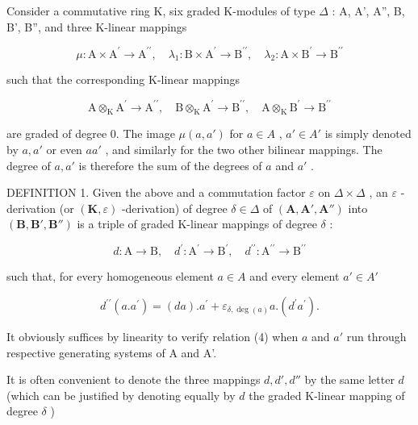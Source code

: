 Consider a commutative ring K, six graded K-modules of type \(\Delta\) : A, A', A'', B, B', B'', and three K-linear mappings

\[
\mu \colon \mathrm{A} \times \mathrm{A} ^ {\prime} \rightarrow \mathrm{A} ^ {\prime \prime}, \quad \lambda_ {1} \colon \mathrm{B} \times \mathrm{A} ^ {\prime} \rightarrow \mathrm{B} ^ {\prime \prime}, \quad \lambda_ {2} \colon \mathrm{A} \times \mathrm{B} ^ {\prime} \rightarrow \mathrm{B} ^ {\prime \prime}
\]

such that the corresponding K-linear mappings

\[
\mathrm{A} \otimes_ {\mathrm{K}} \mathrm{A} ^ {\prime} \rightarrow \mathrm{A} ^ {\prime \prime}, \quad \mathrm{B} \otimes_ {\mathrm{K}} \mathrm{A} ^ {\prime} \rightarrow \mathrm{B} ^ {\prime \prime}, \quad \mathrm{A} \otimes_ {\mathrm{K}} \mathrm{B} ^ {\prime} \rightarrow \mathrm{B} ^ {\prime \prime}
\]

are graded of degree 0. The image \(\mu(a, a')\) for \(a \in A\) , \(a' \in A'\) is simply denoted by \(a, a'\) or even \(aa'\) , and similarly for the two other bilinear mappings. The degree of \(a, a'\) is therefore the sum of the degrees of \(a\) and \(a'\) .

DEFINITION 1. Given the above and a commutation factor \(\varepsilon\) on \(\Delta \times \Delta\) , an \(\varepsilon\) -derivation (or \((\mathbf{K}, \varepsilon)\) -derivation) of degree \(\delta \in \Delta\) of \((\mathbf{A}, \mathbf{A}', \mathbf{A}'')\) into \((\mathbf{B}, \mathbf{B}', \mathbf{B}'')\) is a triple of graded K-linear mappings of degree \(\delta\) :

\[
d \colon \mathrm{A} \rightarrow \mathrm{B}, \quad d ^ {\prime} \colon \mathrm{A} ^ {\prime} \rightarrow \mathrm{B} ^ {\prime}, \quad d ^ {\prime \prime} \colon \mathrm{A} ^ {\prime \prime} \rightarrow \mathrm{B} ^ {\prime \prime}
\]

such that, for every homogeneous element \(a \in A\) and every element \(a' \in A'\)

\[
d ^ {\prime \prime} (a. a ^ {\prime}) = (d a). a ^ {\prime} + \varepsilon_ {\delta , \deg (a)} a. (d ^ {\prime} a ^ {\prime}).\tag{4}
\]

It obviously suffices by linearity to verify relation (4) when \(a\) and \(a'\) run through respective generating systems of A and A'.

It is often convenient to denote the three mappings \(d, d', d''\) by the same letter \(d\) (which can be justified by denoting equally by \(d\) the graded K-linear mapping of degree \(\delta\) )

